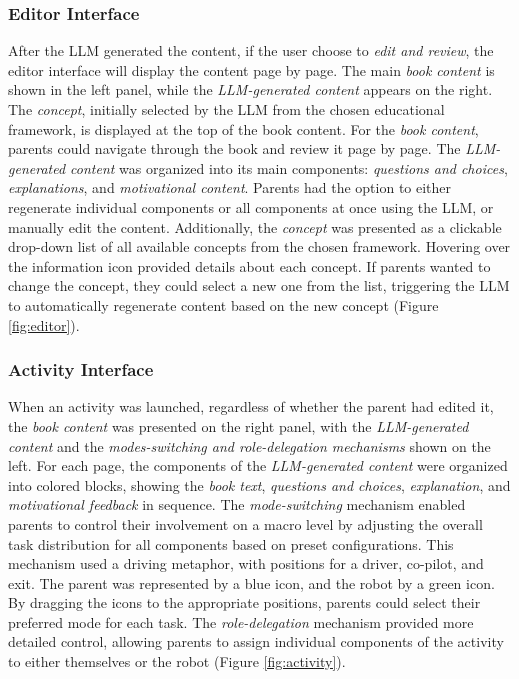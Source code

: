 \subsubsection{Editor Interface}
After the LLM generated the content, if the user choose to \textit{edit and review}, the editor interface will display the content page by page. The main \textit{book content} is shown in the left panel, while the \textit{LLM-generated content} appears on the right. The \textit{concept}, initially selected by the LLM from the chosen educational framework, is displayed at the top of the book content. For the \textit{book content}, parents could navigate through the book and review it page by page. The \textit{LLM-generated content} was organized into its main components: \textit{questions and choices}, \textit{explanations}, and \textit{motivational content}. Parents had the option to either regenerate individual components or all components at once using the LLM, or manually edit the content. Additionally, the \textit{concept} was presented as a clickable drop-down list of all available concepts from the chosen framework. Hovering over the information icon provided details about each concept. If parents wanted to change the concept, they could select a new one from the list, triggering the LLM to automatically regenerate content based on the new concept (Figure \ref{fig:editor}).


\subsubsection{Activity Interface}
When an activity was launched, regardless of whether the parent had edited it, the \textit{book content} was presented on the right panel, with the \textit{LLM-generated content} and the \textit{modes-switching and role-delegation mechanisms} shown on the left. For each page, the components of the \textit{LLM-generated content} were organized into colored blocks, showing the \textit{book text}, \textit{questions and choices}, \textit{explanation}, and \textit{motivational feedback} in sequence. The \textit{mode-switching} mechanism enabled parents to control their involvement on a macro level by adjusting the overall task distribution for all components based on preset configurations. This mechanism used a driving metaphor, with positions for a driver, co-pilot, and exit. The parent was represented by a blue icon, and the robot by a green icon. By dragging the icons to the appropriate positions, parents could select their preferred mode for each task. The \textit{role-delegation} mechanism provided more detailed control, allowing parents to assign individual components of the activity to either themselves or the robot (Figure \ref{fig:activity}).


